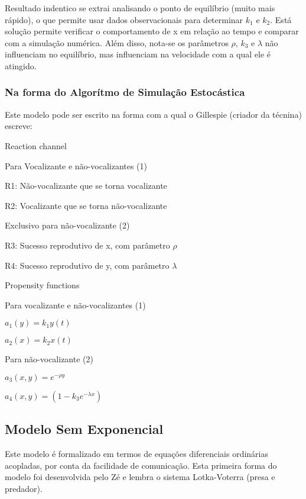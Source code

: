 Resultado indentico se extrai analisando o ponto de equilíbrio (muito mais rápido), o que permite usar dados observacionais para determinar $k_1$ e $k_2$. Está solução permite verificar o comportamento de x em relação ao tempo e comparar com a simulação numérica. Além disso, nota-se os parâmetros $\rho$,  $k_3$ e $\lambda$ não influenciam no equilíbrio, mas influenciam na velocidade com a qual ele é atingido.

\subsubsection{Na forma do Algorítmo de Simulação Estocástica}
Este modelo pode ser escrito na forma com a qual o Gillespie (criador da técnina) escreve:

\vspace{3 mm}
Reaction channel
\vspace{3 mm}

Para Vocalizante e não-vocalizantes (1)

R1: Não-vocalizante que se torna vocalizante

R2: Vocalizante que se torna não-vocalizante

\vspace{3 mm}
Exclusivo para não-vocalizante (2)

R3: Sucesso reprodutivo de x, com parâmetro $\rho$

R4: Sucesso reprodutivo de y, com parâmetro $\lambda$

\vspace{3 mm}
Propensity functions

\vspace{3 mm}
Para vocalizante e não-vocalizantes (1)

\vspace{3 mm}
$a_1(y)=k_1 y(t)$

\vspace{3 mm}
$a_2(x)=k_2 x(t)$

\vspace{3 mm}
Para não-vocalizante (2)

\vspace{3 mm}
$a_3(x,y)=e^{-\rho y}$

\vspace{3 mm}
$a_4(x,y)=(1-k_3 e^{-\lambda x})$

\subsection{Modelo Sem Exponencial}
Este modelo é formalizado em termos de equações diferenciais ordinárias acopladas, por conta da facilidade de comunicação. Esta primeira forma do modelo foi desenvolvida pelo Zé e lembra o sistema Lotka-Voterra (presa e predador).

